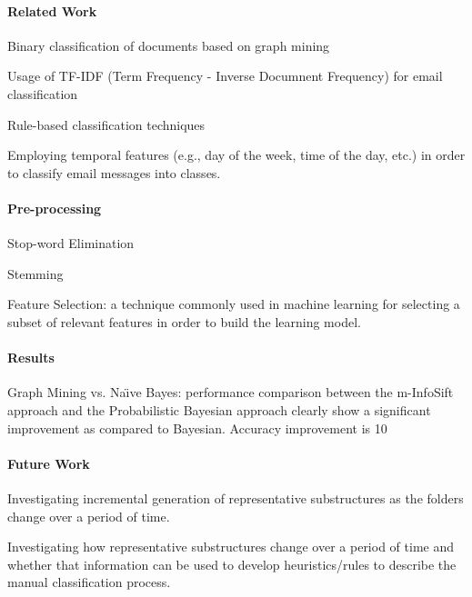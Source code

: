 \documentclass[12pt]{article}
\newenvironment{my_itemize}
{\begin{itemize}
  \setlength{\itemsep}{0cm}
  \setlength{\parskip}{0cm}}
{\end{itemize}}
\begin{document}
\paragraph{Related Work}
\begin{my_itemize}
 \item Binary classification of documents based on graph mining
 \item Usage of TF-IDF (Term Frequency - Inverse Documnent Frequency) for email classification
 \item Rule-based classification techniques
 \item Employing temporal features (e.g., day of the week, time of the day, etc.) in order to classify email messages into classes.
\end{my_itemize}
	 	
\paragraph{Pre-processing}
\begin{my_itemize}
 \item Stop-word Elimination
 \item Stemming
 \item Feature Selection: a technique commonly used in machine learning for selecting a subset of relevant features in order to build the learning model.
\end{my_itemize}
	 	
\paragraph{Results}
\begin{my_itemize}
 \item Graph Mining vs. Na\"{\i}ve Bayes: performance comparison between the m-InfoSift approach and the Probabilistic Bayesian approach clearly show a significant improvement as compared to Bayesian. Accuracy improvement is 10%
\end{my_itemize}

\paragraph{Future Work}
\begin{my_itemize}
 \item Investigating incremental generation of representative substructures as the folders change over a period of time. 
 \item Investigating how representative substructures change over a period of time and whether that information can be used to develop heuristics/rules to describe the manual classification process.
\end{my_itemize}
\end{document}
